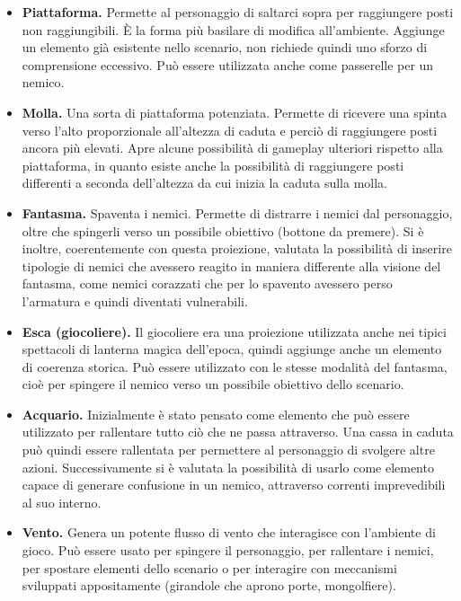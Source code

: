 \begin{itemize}
	\item \textbf{Piattaforma.} \label{item:piattaforma} Permette al personaggio di saltarci sopra per raggiungere posti non raggiungibili. È la forma più basilare di modifica all’ambiente. Aggiunge un elemento già esistente nello scenario, non richiede quindi uno sforzo di comprensione eccessivo. Può essere utilizzata anche come passerelle per un nemico.
	
	\item \textbf{Molla.} Una sorta di piattaforma potenziata. Permette di ricevere una spinta verso l’alto proporzionale all’altezza di caduta e perciò di raggiungere posti ancora più elevati. Apre alcune possibilità di gameplay ulteriori rispetto alla piattaforma, in quanto esiste anche la possibilità di raggiungere posti differenti a seconda dell’altezza da cui inizia la caduta sulla molla.
	
	\item \textbf{Fantasma.} Spaventa i nemici. Permette di distrarre i nemici dal personaggio, oltre che spingerli verso un possibile obiettivo (bottone da premere). Si è inoltre, coerentemente con questa proiezione, valutata la possibilità di inserire tipologie di nemici che avessero reagito in maniera differente alla visione del fantasma, come nemici corazzati che per lo spavento avessero perso l’armatura e quindi diventati vulnerabili.
	
	\item \textbf{Esca (giocoliere).} Il giocoliere era una proiezione utilizzata anche nei tipici spettacoli di lanterna magica dell’epoca, quindi aggiunge anche un elemento di coerenza storica. Può essere utilizzato con le stesse modalità del fantasma, cioè per spingere il nemico verso un possibile obiettivo dello scenario.
	
	\item \textbf{Acquario.} Inizialmente è stato pensato come elemento che può essere utilizzato per rallentare tutto ciò che ne passa attraverso. Una cassa in caduta può quindi essere rallentata per permettere al personaggio di svolgere altre azioni. Successivamente si è valutata la possibilità di usarlo come elemento capace di generare confusione in un nemico, attraverso correnti imprevedibili al suo interno.
	
	\item \textbf{Vento.} \label{item:vento} Genera un potente flusso di vento che interagisce con l’ambiente di gioco. Può essere usato per spingere il personaggio, per rallentare i nemici, per spostare elementi dello scenario o per interagire con meccanismi sviluppati appositamente (girandole che aprono porte, mongolfiere).
	

\end{itemize}
